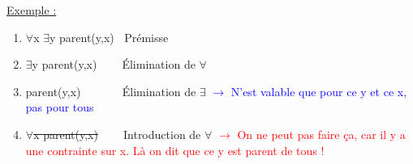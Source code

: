 \begin{flushleft}
\underline{Exemple :}\\
\begin{enumerate}
\item $\forall$x $\exists$y parent(y,x) $\>$ Prémisse
\item $\exists$y parent(y,x) $\>$ $\>$ $\>$ $\>$Élimination de $\forall$
\item parent(y,x) $\>$ $\>$ $\>$ $\>$ $\>$ $\>$ Élimination de $\exists$ \textcolor{blue}{$\rightarrow$ N'est valable que pour ce y et ce x, pas pour tous}
\item \sout{$\forall$x parent(y,x)} $\>$ $\>$ $\>$ $\>$Introduction de $\forall$ \textcolor{red}{$\rightarrow$ On ne peut pas faire ça, car il y a une contrainte sur x. Là on dit que ce y est parent de tous !}
\end{enumerate}




\end{flushleft}
